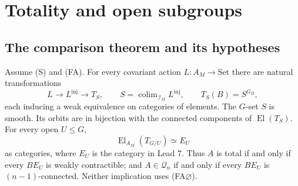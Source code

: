 \section{Totality and open subgroups}

\subsection{The comparison theorem and its hypotheses}

\begin{theorem}
\label{B:saturation}
Assume (S) and (FA). For every covariant action $L:A_M\to\mathrm{Set}$
there are natural transformations
\[
 L\longrightarrow L^{\mathrm{inj}}\longrightarrow T_S,
 \qquad S=\operatorname{colim}_{\mathcal I_M}L^{\mathrm{inj}},
 \qquad T_S(B)=S^{G_B},
\]
each inducing a weak equivalence on categories of elements. The
$G$-set $S$ is smooth. Its orbits are in bijection with the connected
components of $\operatorname{El}(T_S)$. For every open $U\leq G$,
\[
 \operatorname{El}_{A_M}(T_{G/U})\simeq E_U
\]
as categories, where $E_U$ is the category in Lead 7. Thus $A$ is total
if and only if every $BE_U$ is weakly contractible; and $A\in\mathcal Q_n$
if and only if every $BE_U$ is $(n-1)$-connected. Neither implication
uses (FA$\varnothing$).
\end{theorem}
